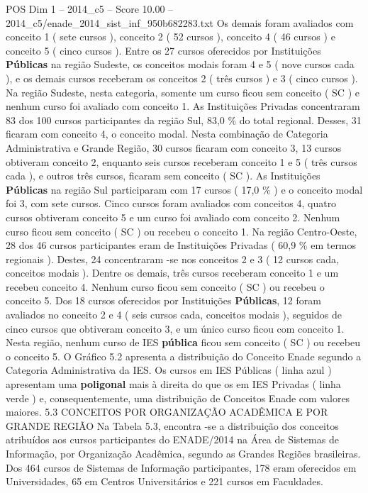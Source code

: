 \begin{textsample}{POS Dim 1 – 2014\_c5 – Score 10.00 – 2014\_c5/enade\_2014\_sist\_inf\_950b682283.txt}
Os demais foram avaliados com conceito 1 ( sete cursos ), conceito 2 ( 52 cursos ), conceito 4 ( 46 cursos ) e conceito 5 ( cinco cursos ).
Entre os 27 cursos oferecidos por Instituições \textbf{Públicas} na região Sudeste, os conceitos modais foram 4 e 5 ( nove cursos cada ), e os demais cursos receberam os conceitos 2 ( três cursos ) e 3 ( cinco cursos ).
Na região Sudeste, nesta categoria, somente um curso ficou sem conceito ( SC ) e nenhum curso foi avaliado com conceito 1.
As Instituições Privadas concentraram 83 dos 100 cursos participantes da região Sul, 83,0 \% do total regional.
Desses, 31 ficaram com conceito 4, o conceito modal.
Nesta combinação de Categoria Administrativa e Grande Região, 30 cursos ficaram com conceito 3, 13 cursos obtiveram conceito 2, enquanto seis cursos receberam conceito 1 e 5 ( três cursos cada ), e outros três cursos, ficaram sem conceito ( SC ).
As Instituições \textbf{Públicas} na região Sul participaram com 17 cursos ( 17,0 \% ) e o conceito modal foi 3, com sete cursos.
Cinco cursos foram avaliados com conceitos 4, quatro cursos obtiveram conceito 5 e um curso foi avaliado com conceito 2.
Nenhum curso ficou sem conceito ( SC ) ou recebeu o conceito 1.
Na região Centro-Oeste, 28 dos 46 cursos participantes eram de Instituições Privadas ( 60,9 \% em termos regionais ).
Destes, 24 concentraram -se nos conceitos 2 e 3 ( 12 cursos cada, conceitos modais ).
Dentre os demais, três cursos receberam conceito 1 e um recebeu conceito 4.
Nenhum curso ficou sem conceito ( SC ) ou recebeu o conceito 5.
Dos 18 cursos oferecidos por Instituições \textbf{Públicas}, 12 foram avaliados no conceito 2 e 4 ( seis cursos cada, conceitos modais ), seguidos de cinco cursos que obtiveram conceito 3, e um único curso ficou com conceito 1.
Nesta região, nenhum curso de IES \textbf{pública} ficou sem conceito ( SC ) ou recebeu o conceito 5.
O Gráfico 5.2 apresenta a distribuição do Conceito Enade segundo a Categoria Administrativa da IES.
Os cursos em IES Públicas ( linha azul ) apresentam uma \textbf{poligonal} mais à direita do que os em IES Privadas ( linha verde ) e, consequentemente, uma distribuição de Conceitos Enade com valores maiores. 5.3 CONCEITOS POR ORGANIZAÇÃO ACADÊMICA E POR GRANDE REGIÃO Na Tabela 5.3, encontra -se a distribuição dos conceitos atribuídos aos cursos participantes do ENADE/2014 na Área de Sistemas de Informação, por Organização Acadêmica, segundo as Grandes Regiões brasileiras.
Dos 464 cursos de Sistemas de Informação participantes, 178 eram oferecidos em Universidades, 65 em Centros Universitários e 221 cursos em Faculdades.

\end{textsample}
